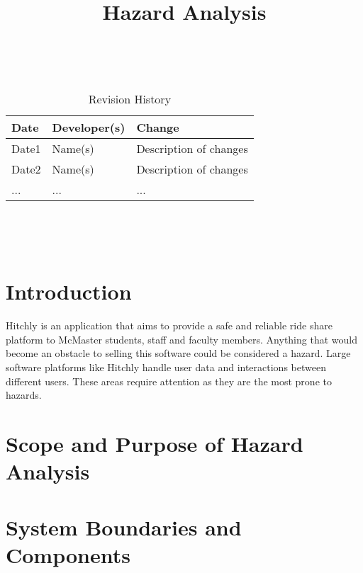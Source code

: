 \documentclass{article}
\title{Hazard Analysis\\\progname}
\author{\authname}
\date{}
\begin{document}
\maketitle
\thispagestyle{empty}

~\newpage


\begin{table}[hp]
\caption{Revision History} \label{TblRevisionHistory}
\begin{tabularx}{\textwidth}{llX}
\toprule
\textbf{Date} & \textbf{Developer(s)} & \textbf{Change}\\
\midrule
Date1 & Name(s) & Description of changes\\
Date2 & Name(s) & Description of changes\\
... & ... & ...\\
\bottomrule
\end{tabularx}
\end{table}

~\newpage

\tableofcontents

~\newpage



\section{Introduction}
Hitchly is an application that aims to provide a safe and reliable ride share platform to McMaster students, staff and faculty members. Anything that would become an obstacle to selling this software could be considered a hazard. Large software platforms like Hitchly handle user data and interactions between different users. These areas require attention as they are the most prone to hazards.  

\section{Scope and Purpose of Hazard Analysis}


\section{System Boundaries and Components}

\end{document}
